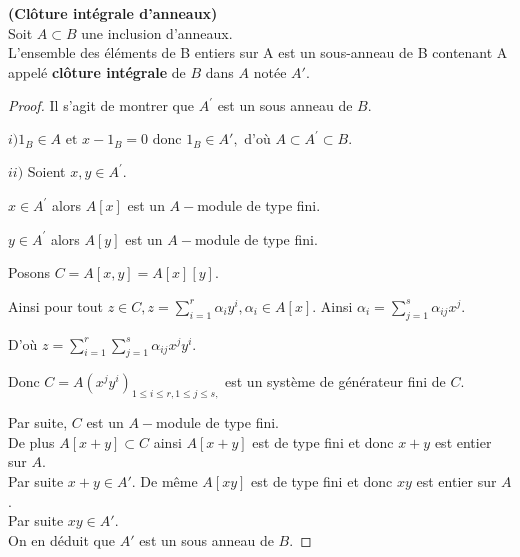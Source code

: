 \begin{moncorollaire}\textbf{(Clôture intégrale d'anneaux)}\cite{Di2}\\
	Soit $A \subset B$ une inclusion d'anneaux.\\
	L'ensemble des éléments de B entiers sur A est un sous-anneau de B contenant A appelé \textbf{clôture intégrale} de $B$ dans $A$ notée $A'$.
\end{moncorollaire}
\begin{proof}
	Il s'agit de montrer que $A^{\prime }$ est un sous anneau de $B.$
	
	$i)$$1_B \in A \text{ et } x-1_B = 0 \text{ donc } 1_B\in A',\text{ d'où } A\subset A^{\prime }\subset B.$
	
	$ii)$ Soient $x,y\in A^{\prime }.$
	
	$x\in A^{\prime }$ alors $A[x]$ est un $A-$module de type fini.
	
	$y\in A^{\prime }$ alors $A[y]$ est un $A-$module de type fini.
	
	Posons $C=A[x,y]=A[x][y].$
	
	Ainsi pour tout $z\in C,z=\sum\limits_{i=1}^{r}\alpha _{i}y^{i},\alpha
	_{i}\in A[x].$ Ainsi $\alpha _{i}=\sum\limits_{j=1}^{s}\alpha _{ij}x^{j}.$
	
	D'où $z=\sum\limits_{i=1}^{r}\sum\limits_{j=1}^{s}\alpha _{ij}x^{j}y^{i}.$
	
	Donc $C=A(x^{j}y^{i})_{1\leq i\leq r,1\leq j\leq s,}$ est un système de générateur fini de $C.$
	
	Par suite, $C$ est un $A-$module de type fini.\\
	De plus $A[x+y] \subset C$ ainsi $A[x+y]$ est de type fini et donc $x+y$ est entier sur $A$.\\ Par suite $x+y \in A'$. De même $A[xy]$ est de type fini et donc $xy$ est entier sur $A$.\\ Par suite $xy \in A'$. \\ On en déduit que $A'$ est un sous anneau de $B$.
\end{proof}

